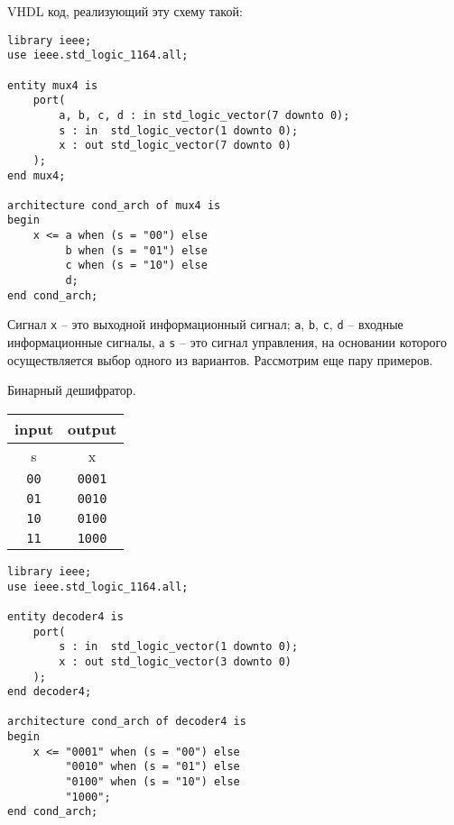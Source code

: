 VHDL код, реализующий эту схему такой:
\begin{Code}
\begin{lstlisting}
library ieee;
use ieee.std_logic_1164.all;

entity mux4 is
    port(
        a, b, c, d : in std_logic_vector(7 downto 0);
        s : in  std_logic_vector(1 downto 0);
        x : out std_logic_vector(7 downto 0)
    );
end mux4;

architecture cond_arch of mux4 is
begin
    x <= a when (s = "00") else
         b when (s = "01") else
         c when (s = "10") else
         d;
end cond_arch;
\end{lstlisting}
\end{Code}

Сигнал \lstinline?x? – это выходной информационный сигнал; \lstinline?a?, \lstinline?b?, \lstinline?c?, \lstinline?d? – входные информационные сигналы, а \lstinline?s? – это сигнал управления, на основании которого осуществляется выбор одного из вариантов. 
Рассмотрим еще пару примеров.

 Бинарный дешифратор.
\begin{table}[h]
\centering
\begin{tabular}{|c|c|}
\hline
input       & output        \\ \hline
s           & x             \\ \hline
\texttt{00} & \texttt{0001} \\
\texttt{01} & \texttt{0010} \\
\texttt{10} & \texttt{0100} \\
\texttt{11} & \texttt{1000} \\
\hline
\end{tabular}
\end{table}

\begin{Code}
\begin{lstlisting}
library ieee;
use ieee.std_logic_1164.all;

entity decoder4 is
    port(
        s : in  std_logic_vector(1 downto 0);
        x : out std_logic_vector(3 downto 0)
    );
end decoder4;

architecture cond_arch of decoder4 is
begin
    x <= "0001" when (s = "00") else
         "0010" when (s = "01") else
         "0100" when (s = "10") else
         "1000";
end cond_arch;
\end{lstlisting}
\end{Code}

